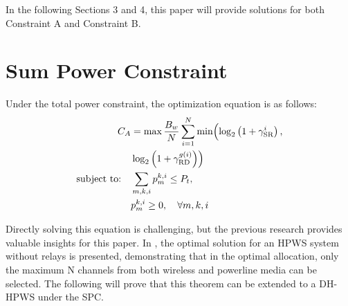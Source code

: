 \documentclass[lettersize,journal]{IEEEtran}
\begin{document}
	In the following Sections 3 and 4, this paper will provide solutions for both Constraint A and Constraint B.
	
	\section{Sum Power Constraint}
	\label{spc}
	Under the total power constraint, the optimization equation is as follows:
	\begin{equation}
		\label{eq:7}
		\begin{aligned}
			C_A &= \max \frac{B_w}{N} \sum_{i=1}^N \min \Bigl( \log_2 \left( 1 + \gamma_{\text{SR}}^i \right), \\
			& \log_2 \left( 1 + \gamma_{\text{RD}}^{g(i)} \right) \Bigr) \\
			\text{subject to:} \quad & \sum_{m,k,i} p_m^{k,i} \leq P_t, \\
			& p_m^{k,i} \geq 0, \quad \forall m,k,i
		\end{aligned}
	\end{equation}
	
	
	
	Directly solving this equation is challenging, but the previous research provides valuable insights for this paper. In \cite{9815250}, the optimal solution for an HPWS system without relays is presented, demonstrating that in the optimal allocation, only the maximum N channels from both wireless and powerline media can be selected. The following will prove that this theorem can be extended to a DH-HPWS under the SPC.
	
\end{document}
